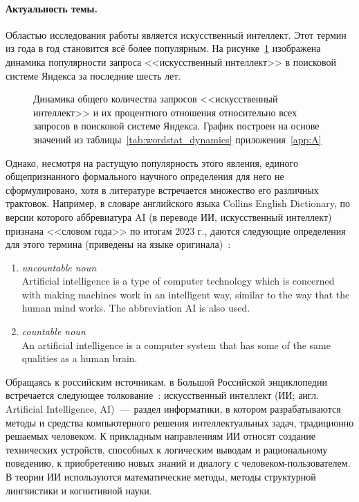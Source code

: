 \paragraph{\indent Актуальность темы.}
Областью исследования работы является искусственный интеллект. Этот термин из года в год становится всё более популярным. На рисунке~\cref{fig:wordstat_dynamics} изображена динамика популярности запроса <<искусственный интеллект>> в поисковой системе Яндекса за последние шесть лет.

\begin{figure}[h!]
    \caption{Динамика общего количества запросов <<искусственный интеллект>> и их процентного отношения относительно всех запросов в поисковой системе Яндекса. График построен на основе значений из таблицы~\cref{tab:wordstat_dynamics} приложения~\cref{app:A}}\label{fig:wordstat_dynamics}
\end{figure}

Однако, несмотря на растущую популярность этого явления, единого общепризнанного формального научного определения для него не сформулировано, хотя в литературе встречается множество его различных трактовок. Например, в словаре английского языка Collins English Dictionary, по версии которого аббревиатура AI (в переводе ИИ, искусственный интеллект) признана <<словом года>> по итогам 2023 г., даются следующие определения для этого термина (приведены на языке оригинала)~\cite{collins2023}:
\begin{enumerate}
\item \textit{uncountable noun} \\
	Artificial intelligence is a type of computer technology which is concerned with making machines work in an intelligent way, similar to the way that the human mind works. The abbreviation AI is also used.
\item \textit{countable noun} \\
	An artificial intelligence is a computer system that has some of the same qualities as a human brain.
\end{enumerate}
Обращаясь к российским источникам, в Большой Российской энциклопедии встречается следующее толкование~\cite{bre11}: искусственный интеллект (ИИ; англ. Artificial Intelligence, AI)~---~раздел информатики, в котором разрабатываются методы и средства компьютерного решения интеллектуальных задач, традиционно решаемых человеком. К прикладным направлениям ИИ относят создание технических устройств, способных к логическим выводам и рациональному поведению, к приобретению новых знаний и диалогу с человеком-пользователем. В теории ИИ используются математические методы, методы структурной лингвистики и когнитивной науки.

